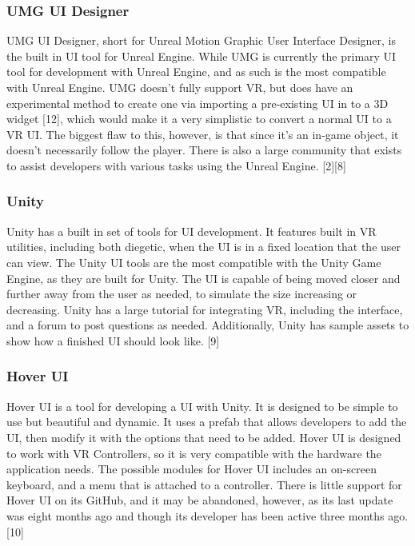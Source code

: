 \documentclass[onecolumn, draftclsnofoot,10pt, compsoc]{IEEEtran}
\begin{document}
\subsubsection{UMG UI Designer}
UMG UI Designer, short for Unreal Motion Graphic User Interface Designer, is the built in UI tool for Unreal Engine. While UMG is currently the primary UI tool for development with Unreal Engine, and as such is the most compatible with Unreal Engine. UMG doesn't fully support VR, but does have an experimental method to create one via importing a pre-existing UI in to a 3D widget [12], which would make it a very simplistic to convert a normal UI to a VR UI. The biggest flaw to this, however, is that since it's an in-game object, it doesn't necessarily follow the player. There is also a large community that exists to assist developers with various tasks using the Unreal Engine. [2][8]

\subsubsection{Unity}
Unity has a built in set of tools for UI development. It features built in VR utilities, including both diegetic, when the UI is in a fixed location that the user can view. The Unity UI tools are the most compatible with the Unity Game Engine, as they are built for Unity. The UI is capable of being moved closer and further away from the user as needed, to simulate the size increasing or decreasing. Unity has a large tutorial for integrating VR, including the interface, and a forum to post questions as needed. Additionally, Unity has sample assets to show how a finished UI should look like. [9] 


\subsubsection{Hover UI}
Hover UI is a tool for developing a UI with Unity. It is designed to be simple to use but beautiful and dynamic. It uses a prefab that allows developers to add the UI, then modify it with the options that need to be added. Hover UI is designed to work with VR Controllers, so it is very compatible with the hardware the application needs. The possible modules for Hover UI includes an on-screen keyboard, and a menu that is attached to a controller. There is little support for Hover UI on its GitHub, and it may be abandoned, however, as its last update was eight months ago and though its developer has been active three months ago. [10]
\end{document}
